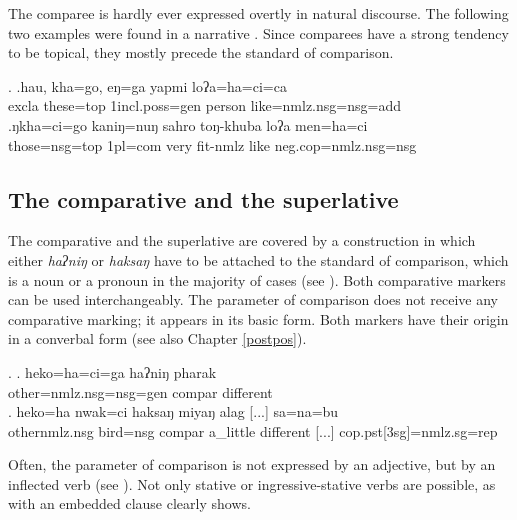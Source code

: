  The comparee is hardly ever expressed overtly in natural discourse. The following two examples were found in a narrative \Next.  Since comparees have a strong tendency to be  topical, they mostly precede the standard of comparison.

\ex. \ag.hau,  kha=go,      eŋ=ga              yapmi  loʔa=ha=ci=ca\\
{\sc excla} these{\sc =top} {\sc 1incl.poss=gen} person like{\sc =nmlz.nsg=nsg=add}\\
 
\bg.ŋkha=ci=go  kaniŋ=nuŋ   sahro toŋ-khuba   loʔa men=ha=ci\\
  those{\sc =nsg=top} {\sc 1pl=com} very fit-{\sc nmlz} like {\sc neg.cop=nmlz.nsg=nsg}\\
   


\subsection{The comparative and the superlative}

The comparative and the superlative are covered by a construction in which either \emph{haʔniŋ} or \emph{haksaŋ} have to be attached to the standard of comparison, which is a noun or a pronoun in the majority of cases (see \Next). Both comparative markers can be used interchangeably. The parameter of comparison does not receive any comparative marking; it appears in its basic form. Both markers have their origin in a converbal form (see also Chapter \ref{postpos}).

\ex. \ag. heko=ha=ci=ga haʔniŋ  pharak \\
other{\sc =nmlz.nsg=nsg=gen} {\sc compar} different\\
\bg. heko=ha nwak=ci haksaŋ miyaŋ alag [...] sa=na=bu\\
	other{\sc nmlz.nsg} bird{\sc =nsg} {\sc compar}  a\_little different [...] {\sc cop.pst[3sg]=nmlz.sg=rep}\\
	 
	
Often, the parameter of comparison is not expressed by an adjective, but by an inflected verb (see \Next). Not only stative or ingressive-stative verbs are possible, as \Next[b] with an embedded clause clearly shows.

